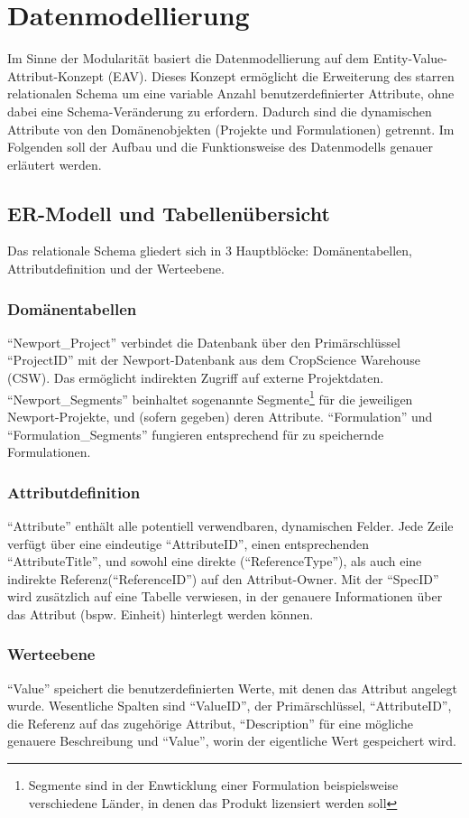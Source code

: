 \section{Datenmodellierung}
Im Sinne der Modularität basiert die Datenmodellierung auf dem Entity-Value-Attribut-Konzept (EAV). Dieses Konzept ermöglicht die Erweiterung 
des starren relationalen Schema um eine variable Anzahl benutzerdefinierter Attribute, ohne dabei eine Schema-Veränderung zu erfordern. Dadurch 
sind die dynamischen Attribute von den Domänenobjekten (Projekte und Formulationen) getrennt. Im Folgenden soll der Aufbau und die Funktionsweise
des Datenmodells genauer erläutert werden.
\subsection{ER-Modell und Tabellenübersicht}
Das relationale Schema gliedert sich in 3 Hauptblöcke: Domänentabellen, Attributdefinition und der Werteebene. 
\subsubsection{Domänentabellen}
\enquote{Newport\_Project} verbindet die Datenbank über den Primärschlüssel \enquote{ProjectID} mit der Newport-Datenbank aus dem CropScience Warehouse (CSW). 
Das ermöglicht indirekten Zugriff auf externe Projektdaten. \enquote{Newport\_Segments} beinhaltet sogenannte Segmente\footnote{Segmente sind in der Enwticklung einer Formulation beispielsweise verschiedene Länder, in denen das Produkt lizensiert werden soll} 
für die jeweiligen Newport-Projekte, und (sofern gegeben) deren Attribute. \enquote{Formulation} und \enquote{Formulation\_Segments} fungieren entsprechend für 
zu speichernde Formulationen.
\subsubsection{Attributdefinition}
\enquote{Attribute} enthält alle potentiell verwendbaren, dynamischen Felder. Jede Zeile verfügt über eine eindeutige \enquote{AttributeID}, einen entsprechenden \enquote{AttributeTitle},
und sowohl eine direkte (\enquote{ReferenceType}), als auch eine indirekte Referenz(\enquote{ReferenceID}) auf den Attribut-Owner. Mit der \enquote{SpecID} wird zusätzlich
auf eine Tabelle verwiesen, in der genauere Informationen über das Attribut (bspw. Einheit) hinterlegt werden können.
\subsubsection{Werteebene}
\enquote{Value} speichert die benutzerdefinierten Werte, mit denen das Attribut angelegt wurde. Wesentliche Spalten sind \enquote{ValueID}, der Primärschlüssel, \enquote{AttributeID},
die Referenz auf das zugehörige Attribut, \enquote{Description} für eine mögliche genauere Beschreibung und \enquote{Value}, worin der eigentliche Wert gespeichert wird.
